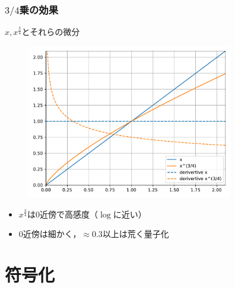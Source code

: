 \documentclass[14pt,xcolor=dvipsnames,table,dvipdfmx]{beamer}
\begin{document}

\begin{frame}[c]
    \frametitle{$3/4$乗の効果}
    $x, x^{\frac{3}{4}}$とそれらの微分
    \vspace{-8pt}
    \begin{figure}
        \includegraphics[width=90mm]{./figs/powered_quantization_curve.pdf}
    \end{figure}
    \vspace{-10pt}
    \begin{itemize}
        \item $x^{\frac{3}{4}}$は$0$近傍で高感度（$\log$に近い）
        \item $0$近傍は細かく，$\approx 0.3$以上は荒く量子化
    \end{itemize}
\end{frame}

\section{符号化}
\end{document}
